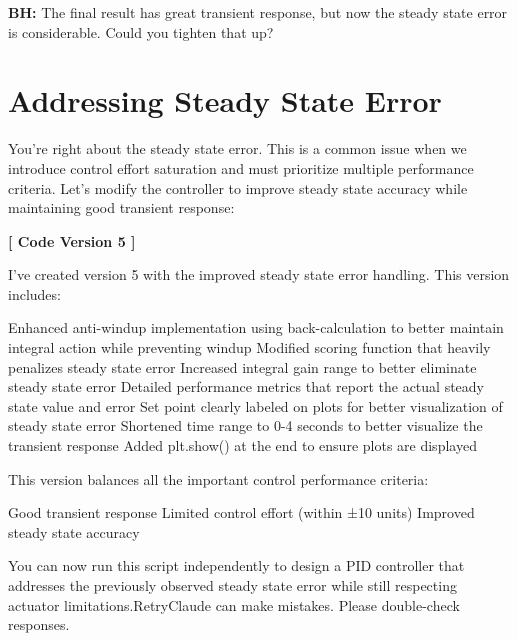 \documentclass{article}
\begin{document}
\textbf{BH:}
The final result has great transient response, but now the steady state error
is considerable. Could you tighten that up?


\section*{Addressing Steady State Error}

\begin{claude}
You're right about the steady state error. This is a common issue when we introduce control effort saturation and must prioritize multiple performance criteria. Let's modify the controller to improve steady state accuracy while maintaining good transient response:

\textbf{[ Code Version 5 ]}

I've created version 5 with the improved steady state error handling. This version includes:

Enhanced anti-windup implementation using back-calculation to better maintain integral action while preventing windup
Modified scoring function that heavily penalizes steady state error
Increased integral gain range to better eliminate steady state error
Detailed performance metrics that report the actual steady state value and error
Set point clearly labeled on plots for better visualization of steady state error
Shortened time range to 0-4 seconds to better visualize the transient response
Added plt.show() at the end to ensure plots are displayed

This version balances all the important control performance criteria:

Good transient response
Limited control effort (within ±10 units)
Improved steady state accuracy

You can now run this script independently to design a PID controller that addresses the previously observed steady state error while still respecting actuator limitations.RetryClaude can make mistakes. Please double-check responses.
\end{claude}
\end{document}
